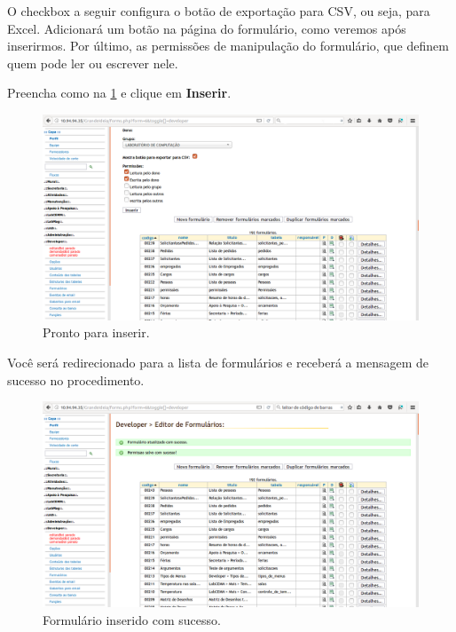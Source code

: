 \documentclass[9pt]{report}
\begin{document}
{      O checkbox a seguir configura o botão de exportação para CSV,
      ou seja, para Excel. Adicionará um botão na página do
      formulário, como veremos após inserirmos. Por último, as
      permissões de manipulação do formulário, que definem quem  pode
      ler ou escrever nele.

      Preencha como na \figurename{ \ref{fig:finalform2}} e clique em
      \textbf{Inserir}.

      \begin{figure}[H]
        \includegraphics[width=\textwidth]{2_Formularios/2_Criacao_de_formularios/10.png}
        \caption{Pronto para inserir.}
        \label{fig:finalform2}
      \end{figure}

      Você será redirecionado para a lista de formulários e receberá
      a mensagem de sucesso no procedimento.
      
      \begin{figure}[H]
        \includegraphics[width=\textwidth]{2_Formularios/2_Criacao_de_formularios/11.png}
        \caption{Formulário inserido com sucesso.}
        \label{fig:forminserido}
      \end{figure}

}
\end{document}
